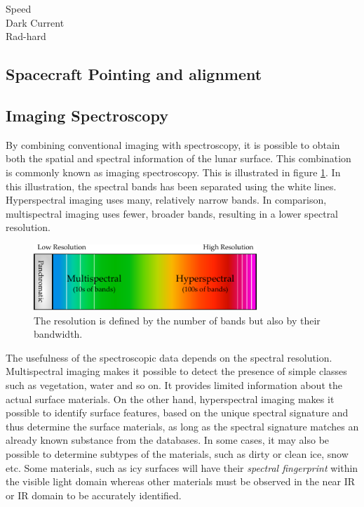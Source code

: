 \begin{description}
\item[Speed]
\item[Dark Current]
\item[Rad-hard]
\end{description}
\subsection{Spacecraft Pointing and alignment}
\subsection{Imaging Spectroscopy}\label{sec:imaging_spectroscopy}
By combining conventional imaging with spectroscopy, it is possible to obtain both the spatial and spectral information of the lunar surface. This combination is commonly known as imaging spectroscopy. This is illustrated in figure \ref{fig:spectral_information}. In this illustration, the spectral bands has been separated using the white lines. Hyperspectral imaging uses many, relatively narrow bands. In comparison, multispectral imaging uses fewer, broader bands, resulting in a lower spectral resolution. 
\begin{figure}[htb!]
\centering
\includegraphics[width=0.75\textwidth]{figures/Orbiter/spectral_information}
\caption{The resolution is defined by the number of bands but also by their bandwidth.}
\label{fig:spectral_information}
\end{figure}
The usefulness of the spectroscopic data depends on the spectral resolution\cite{elowitz2016}. Multispectral imaging makes it possible to detect the presence of simple classes such as vegetation, water and so on. It provides limited information about the actual surface materials. On the other hand, hyperspectral imaging makes it possible to identify surface features, based on the unique spectral signature and thus determine the surface materials, as long as the spectral signature matches an already known substance from the databases. In some cases, it may also be possible to determine subtypes of the materials, such as dirty or clean ice, snow etc\cite{naegeli2015a}. Some materials, such as icy surfaces will have their \textit{spectral fingerprint} within the visible light domain whereas other materials must be observed in the near IR or IR domain to be accurately identified.

